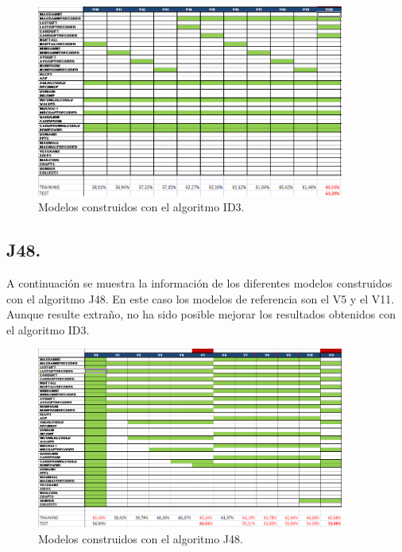 \begin{figure}[H]
\begin{center}
\includegraphics[width=0.9\textwidth]{img/id3-2}
\caption{Modelos construidos con el algoritmo ID3.}
\end{center}
\end{figure}

\subsection{J48.}

A continuación se muestra la información de los diferentes modelos construidos con el algoritmo J48. En este caso los modelos de referencia son el V5 y el V11. Aunque resulte extraño, no ha sido posible mejorar los resultados obtenidos con el algoritmo ID3.

\begin{figure}[H]
\begin{center}
\includegraphics[width=0.9\textwidth]{img/j48-1}
\caption{Modelos construidos con el algoritmo J48.}
\end{center}
\end{figure}

